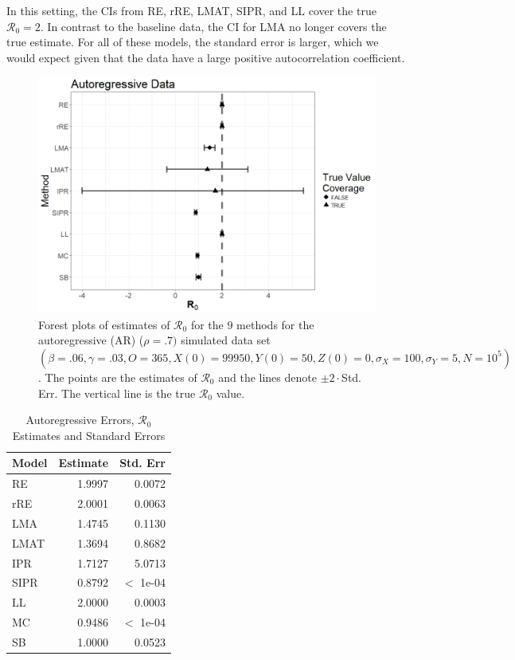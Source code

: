 \documentclass[12pt]{article}
\newcommand{\xxsir}{\ensuremath{9} } %
\newcommand{\rr}{\ensuremath{\mathcal{R}_0}}
\begin{document}
In this setting, the CIs from RE, rRE, LMAT, SIPR, and LL cover the true $\rr=2$.  In contrast to the baseline data, the CI for LMA no longer covers the true estimate.  For all of these models, the standard error is larger, which we would expect given that the data have a large positive autocorrelation coefficient.


\begin{figure}[H]
  \centering
  \includegraphics[scale=0.5]{images/AR.jpeg}
  \caption{Forest plots of estimates of $\rr$ for the \xxsir methods for the autoregressive (AR) ($\rho=.7)$ simulated data set $(\beta=.06, \gamma=.03, O=365, X(0)=99950, Y(0)=50, Z(0)=0, \sigma_X=100, \sigma_Y=5, N=10^5)$.  The points are the estimates of $\rr$ and the lines denote $\pm 2\cdot $Std. Err.  The vertical line is the true $\rr$ value.}
  \end{figure}\label{fig:ar-res}
\begin{table}[H]
	
	\centering
	\begin{tabular}[t]{l|r|r}
		\hline
		Model & Estimate & Std. Err\\
		\hline
		RE & 1.9997 & 0.0072\\
		\hline
		rRE & 2.0001 & 0.0063\\
		\hline
		LMA & 1.4745 & 0.1130\\
		\hline
		LMAT & 1.3694 & 0.8682\\
		\hline
		IPR & 1.7127 & 5.0713\\
		\hline
		SIPR & 0.8792 & $<$ 1e-04 \\
		\hline
		LL & 2.0000 & 0.0003\\
		\hline
		MC & 0.9486 & $<$ 1e-04 \\
		\hline
		SB & 1.0000 & 0.0523\\
		\hline
	\end{tabular}
        \caption{Autoregressive Errors, $\rr$ Estimates and Standard Errors}\label{tab:ar-res}
\end{table}
\end{document}
